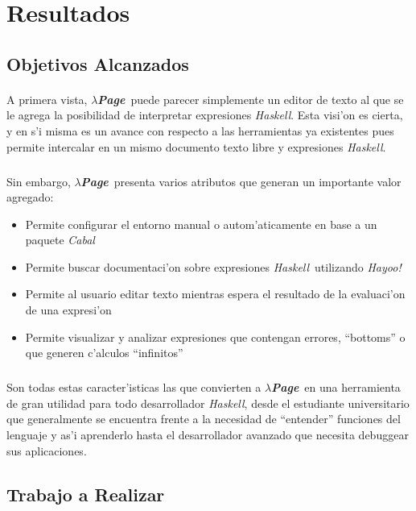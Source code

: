 \documentclass[a4paper]{article}
\newcommand{\haskell}{\textsl{Haskell}}
\newcommand{\hpage}{\textbf{\textsl{$\lambda$Page}}}
\newcommand{\cabal}{\textsl{Cabal}}
\begin{document}
\section{Resultados}
\subsection{Objetivos Alcanzados}
\begin{epigraphs}
\end{epigraphs}
\paragraph{}A primera vista, \hpage\ puede parecer simplemente un editor de texto al que se le agrega la posibilidad de interpretar expresiones \haskell.  Esta visi'on es cierta, y en s'i misma es un avance con respecto a las herramientas ya existentes pues permite intercalar en un mismo documento texto libre y expresiones \haskell.
\subparagraph{}Sin embargo, \hpage\ presenta varios atributos que generan un importante valor agregado:
\begin{itemize}
	\item Permite configurar el entorno manual o autom'aticamente en base a un paquete \cabal
	\item Permite buscar documentaci'on sobre expresiones \haskell\ utilizando \textsl{Hayoo!}
	\item Permite al usuario editar texto mientras espera el resultado de la evaluaci'on de una expresi'on
	\item Permite visualizar y analizar expresiones que contengan errores, ``bottoms'' o que generen c'alculos ``infinitos''
\end{itemize}
\subparagraph{}Son todas estas caracter'isticas las que convierten a \hpage\ en una herramienta de gran utilidad para todo desarrollador \haskell, desde el estudiante universitario que generalmente se encuentra frente a la necesidad de ``entender''  funciones del lenguaje y as'i aprenderlo hasta el desarrollador avanzado que necesita debuggear sus aplicaciones.

\newpage
\subsection{Trabajo a Realizar}
\begin{epigraphs}
\end{epigraphs}
\end{document}
